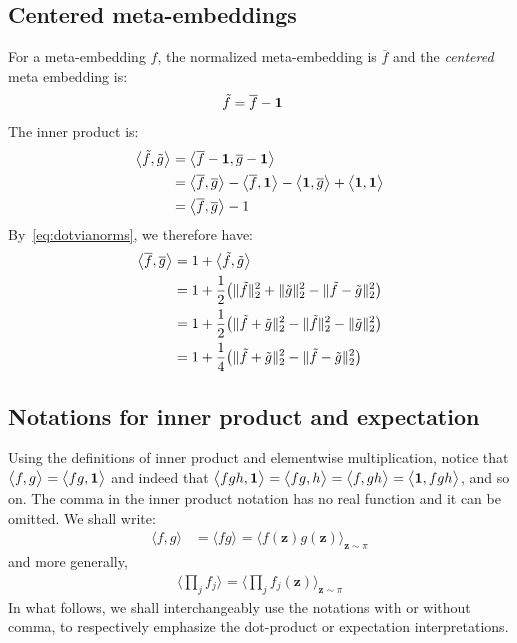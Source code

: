 \documentclass[a4paper,oneside,12pt,english]{report}
\def\zvec{\mathbf{z}}
\def\expv#1#2{\bigl\langle#1\bigr\rangle_{#2}}
\def\dot#1#2{\expv{#1,#2}{}}
\def\normal#1{\overline{#1}}
\def\dotn#1#2{\dot{\normal{#1}}{\normal{#2}}}
\begin{document}
\subsection{Centered meta-embeddings}
For a meta-embedding $f$, the normalized meta-embedding is $\normal{f}$ and the \emph{centered} meta embedding is:
\begin{align}
\tilde{f} &= \normal{f}-\onevec
\end{align}	
The inner product is:
\begin{align}
\begin{split}
\dot{\tilde{f}}{\tilde{g}} &= \dot{\normal{f}-\onevec}{\normal{g}-\onevec} \\
&= \dotn{f}{g} -\dot{\normal{f}}{\onevec} -\dot{\onevec}{\normal{g}} + \dot{\onevec}{\onevec} \\
&= \dotn{f}{g} -1
\end{split}
\end{align}
By~\eqref{eq:dotvianorms}, we therefore have:
\begin{align}
\begin{split}
\dotn{f}{g} &= 1+ \dot{\tilde{f}}{\tilde{g}} \\
&= 1+ \frac12\bigl(\norm{\tilde{f}}^2+\norm{\tilde{g}}^2 - \norm{\tilde{f}-\tilde{g}}^2\bigr) \\
&= 1+ \frac12\bigl(\norm{\tilde{f}+\tilde{g}}^2 - \norm{\tilde{f}}^2- \norm{\tilde{g}}^2\bigr)  \\
&= 1+ \frac14\bigl(\norm{\tilde{f}+\tilde{g}}^2-\norm{\tilde{f}-\tilde{g}}^2\bigr)
\end{split}
\end{align}	
\subsection{Notations for inner product and expectation}
Using the definitions of inner product and elementwise multiplication, notice that $\dot{f}{g}=\dot{fg}{\onevec}$ and indeed that $\dot{fgh}{\onevec}=\dot{fg}{h}=\dot{f}{gh}=\dot{\onevec}{fgh}$, and so on. The comma in the inner product notation has no real function and it can be omitted. We shall write:
\begin{align}
\dot{f}{g} &= \expv{fg}{} = \expv{f(\zvec)g(\zvec)}{\zvec\sim\pi}
\end{align} 
and more generally,
\begin{align}
\expv{\prod_j f_j}{} = \expv{\prod_j f_j(\zvec)}{\zvec\sim\pi}
\end{align} 
In what follows, we shall interchangeably use the notations with or without comma, to respectively emphasize the dot-product or expectation interpretations.
\end{document}
